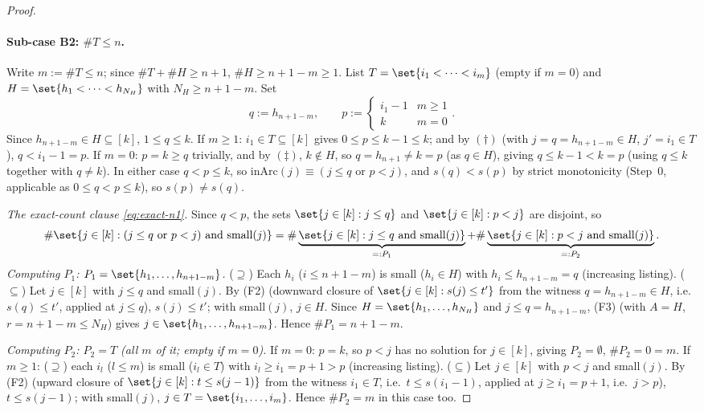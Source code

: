 \begin{proof}
  \paragraph{Sub-case B2: $\#T\le n$.} Write $m:=\#T\le n$; since $\#T+\#H\ge n+1$,
  $\#H\ge n+1-m\ge1$. List $T=\set{i_1<\dots<i_m}$ (empty if $m=0$) and $H=\set{h_1<\dots<
  h_{N_H}}$ with $N_H\ge n+1-m$. Set
  \[
    q := h_{n+1-m} , \qquad p := \begin{cases} i_1-1 & m\ge1 \\ k & m=0 \end{cases} .
  \]
  Since $h_{n+1-m}\in H\subseteq[k]$, $1\le q\le k$. If $m\ge1$: $i_1\in T\subseteq[k]$ gives
  $0\le p\le k-1\le k$; and by $(\dagger)$ (with $j=q=h_{n+1-m}\in H$, $j'=i_1\in T$), $q<i_1-1=p$.
  If $m=0$: $p=k\ge q$ trivially, and by $(\ddagger)$, $k\notin H$, so $q=h_{n+1}\ne k=p$ (as
  $q\in H$), giving $q\le k-1<k=p$ (using $q\le k$ together with $q \ne k$). In either case
  $q<p\le k$, so $\mathrm{inArc}(j)\equiv (j\le q \text{ or } p<j)$, and $s(q)<s(p)$ by strict
  monotonicity (Step~0, applicable as $0\le q<p\le k$), so $s(p)\ne s(q)$.

  \emph{The exact-count clause \eqref{eq:exact-n1}.} Since $q<p$, the sets $\set{j\in[k]:j\le q}$
  and $\set{j\in[k]:p<j}$ are disjoint, so
  \[
    \#\set{j\in[k]: (j\le q\text{ or }p<j)\text{ and small}(j)}
    = \#\underbrace{\set{j\in[k]:j\le q\text{ and small}(j)}}_{=:P_1}
    + \#\underbrace{\set{j\in[k]:p<j\text{ and small}(j)}}_{=:P_2}
    .
  \]
  \emph{Computing $P_1$: $P_1=\set{h_1,\dots,h_{n+1-m}}$.} ($\supseteq$) Each $h_i$ ($i\le n+1-m$)
  is small ($h_i\in H$) with $h_i\le h_{n+1-m}=q$ (increasing listing). ($\subseteq$) Let $j\in[k]$
  with $j\le q$ and small$(j)$. By (F2) (downward closure of $\set{j\in[k]:s(j)\le t'}$ from the
  witness $q=h_{n+1-m}\in H$, i.e.\ $s(q)\le t'$, applied at $j\le q$), $s(j)\le t'$; with
  small$(j)$, $j\in H$. Since $H=\set{h_1,\dots,h_{N_H}}$ and $j\le q=h_{n+1-m}$, (F3) (with
  $A=H$, $r=n+1-m\le N_H$) gives $j\in\set{h_1,\dots,h_{n+1-m}}$. Hence $\#P_1=n+1-m$.

  \emph{Computing $P_2$: $P_2=T$ (all $m$ of it; empty if $m=0$).} If $m=0$: $p=k$, so $p<j$ has
  no solution for $j\in[k]$, giving $P_2=\emptyset$, $\#P_2=0=m$. If $m\ge1$: ($\supseteq$) each
  $i_l$ ($l\le m$) is small ($i_l\in T$) with $i_l\ge i_1=p+1>p$ (increasing listing). ($\subseteq$)
  Let $j\in[k]$ with $p<j$ and small$(j)$. By (F2) (upward closure of $\set{j\in[k]:t\le s(j-1)}$
  from the witness $i_1\in T$, i.e.\ $t\le s(i_1-1)$, applied at $j\ge i_1=p+1$, i.e.\ $j>p$),
  $t\le s(j-1)$; with small$(j)$, $j\in T=\set{i_1,\dots,i_m}$. Hence $\#P_2=m$ in this case too.


\end{proof}
